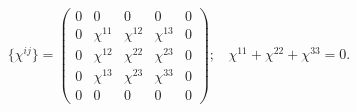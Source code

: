 \begin{equation}
\{ \chi^{ij} \} = \left( \begin{array} {ccccc}
0 & 0 & 0 & 0 & 0 \\
0 &  \chi^{11}        &   \chi^{12}      &  \chi^{13}  & 0 \\
0 &  \chi^{12}        &   \chi^{22}      &  \chi^{23}   & 0 \\
0 &  \chi^{13}        &  \chi^{23}       &  \chi^{33}   & 0 \\
0 & 0 & 0 & 0 & 0 \end{array} \right); ~~~~ \chi^{11} + \chi^{22} + \chi^{33} =0.
\label{94}
\end{equation}


